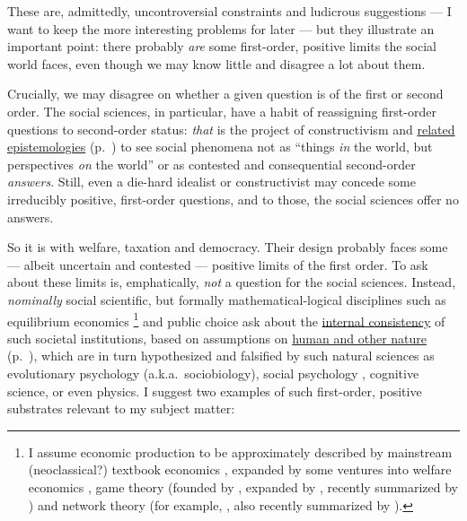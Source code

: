 These are, admittedly, uncontroversial constraints and ludicrous suggestions --- I want to keep the more interesting problems for later --- but they illustrate an important point:
there probably \emph{are} some first-order, positive limits the social world faces, even though we may know little and disagree a lot about them.

Crucially, we may disagree on whether a given question is of the first or second order.
The social sciences, in particular, have a habit of reassigning first-order questions to second-order status:
\emph{that} is the project of constructivism \citep[for example,][]{Berger1966} and \hyperref[itm:constructivism]{related epistemologies} (p.~\pageref{itm:constructivism}) to see social phenomena not as ``things \emph{in} the world, but perspectives \emph{on} the world'' \citep[174 on ethnicity, emphasis in the original]{Brubaker-2002-aa} or as contested and consequential second-order \emph{answers}.
Still, even a die-hard idealist or constructivist may concede some irreducibly positive, first-order questions, and to those, the social sciences offer no answers.

So it is with welfare, taxation and democracy.
Their design probably faces some --- albeit uncertain and contested --- positive limits of the first order.
To ask about these limits is, emphatically, \emph{not} a question for the social sciences.
Instead, \emph{nominally} social scientific, but formally mathematical-logical disciplines such as equilibrium economics
\footnote{
	I assume economic production to be approximately described by mainstream (neoclassical?) textbook economics \citep[including][]{Mankiw-2004-aa,FrankBernanke2004}, expanded by some ventures into welfare economics \citep{Hicks1939,Samuelson-1954-eu},  game theory (founded by \citealt{VonNeumannMorgenstern1944,Nash1951},  expanded by \citealt{Axelrod1981a}, recently summarized by \citealt{Kleinberg-2009-oz}) and network theory (for example, \citealt{Mandelbrot2004}, \citealt{Jackson1968} also recently summarized by \citealt{Kleinberg-2009-oz}).
}
and public choice ask about the \hyperref[itm:internal-consistency]{internal consistency} of such societal institutions, based on assumptions on \hyperref[itm:a-posteriori]{human and other nature} (p.~\pageref{itm:a-posteriori}), which are in turn hypothesized and falsified by such natural sciences as evolutionary psychology (a.k.a.\ sociobiology), social psychology \citep[initially][]{KahnemanTversky1979}, cognitive science, or even physics.
I suggest two examples of such first-order, positive substrates relevant to my subject matter:

